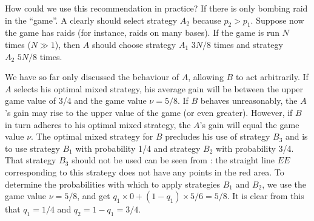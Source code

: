 How could we use this recommendation in practice? If there is only
 bombing raid in the ``game''. A clearly should select strategy $A_{2}$ because $p_{2} > p_{1}$. Suppose now the game has  raids (for instance, raids on many bases). If the game is run $N$ times ($N \gg 1$), then $A$ should choose strategy $A_{1} \,\, 3N/8$ times and strategy $A_{2} \,\, 5N/8$ times.

We have so far only discussed the behaviour of $A$, allowing $B$ to act
arbitrarily. If $A$ selects his optimal mixed strategy, his average gain will
be between the upper game value of 3/4 and the game value $\nu = 5/8$. If
$B$ behaves unreasonably, the $A$'s gain may rise to the upper value of the
game (or even greater). However, if $B$ in turn adheres to his optimal
mixed strategy, the $A$'s gain will equal the game value $\nu$. The optimal
mixed strategy for $B$ precludes his use of strategy $B_{3}$ and is to use
strategy $B_{1}$ with probability 1/4 and strategy $B_{2}$ with probability 3/4.
That strategy $B_{3}$ should not be used can be seen from : the
straight line $EE$ corresponding to this strategy does not have any points
in the red area. To determine the probabilities with which to apply
strategies $B_{1}$  and $B_{2}$, we use the game value $\nu = 5/8$, and get $q_{1} \times 0 + (1 - q_{1}) \times 5/6 = 5/8$. It is clear from this that $q_{1} = 1/4$ and $q_{2} = 1 - q_{1} = 3/4$.


